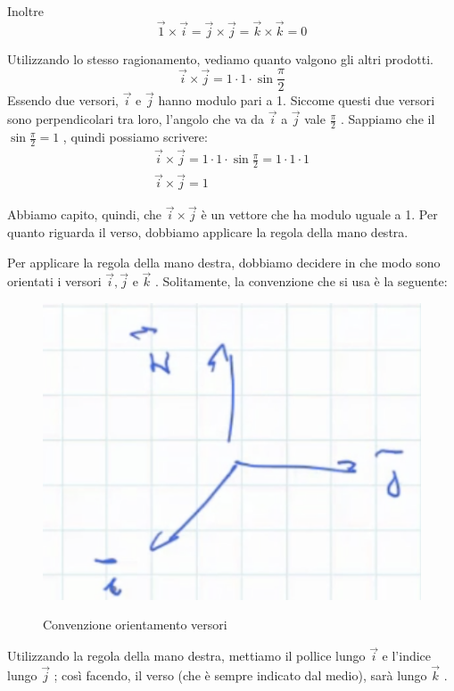 \documentclass[a4paper]{book}
\begin{document}
Inoltre
$$ \overrightarrow{1} \times \overrightarrow{i} = \overrightarrow{j} \times \overrightarrow{j} = \overrightarrow{k} \times \overrightarrow{k} = 0 $$

Utilizzando lo stesso ragionamento, vediamo quanto valgono gli altri prodotti.
$$ \overrightarrow{i} \times \overrightarrow{j} = 1 \cdot 1 \cdot \sin \frac{\pi}{2} $$
Essendo due versori, $ \overrightarrow{i} $ e $ \overrightarrow{j} $ hanno modulo pari a 1. Siccome questi due versori sono perpendicolari tra loro, l'angolo che va da $\overrightarrow{i} $ a $\overrightarrow{j} $ vale $ \frac{\pi}{2} $ .  Sappiamo che il $ \sin \frac{\pi}{2} = 1 $ , quindi possiamo scrivere:
\begin{align*}
\overrightarrow{i} \times \overrightarrow{j} = 1 \cdot 1 \cdot \sin \frac{\pi}{2} = 1 \cdot 1 \cdot 1 \\
\overrightarrow{i} \times \overrightarrow{j} = 1
\end{align*}

Abbiamo capito, quindi, che $ \overrightarrow{i} \times \overrightarrow{j} $ è un vettore che ha modulo uguale a 1. Per quanto riguarda il verso, dobbiamo applicare la regola della mano destra.

Per applicare la regola della mano destra, dobbiamo decidere in che modo sono orientati i versori $ \overrightarrow{i} , \overrightarrow{j} $ e $ \overrightarrow{k} $ . Solitamente, la convenzione che si usa è la seguente:

\begin{figure}[h]
\begin{center}
\includegraphics[width = 0.5 \textwidth]{convenzione versori}
\label{fig:convenzione}
\caption{Convenzione orientamento versori}
\end{center}
\end{figure}

Utilizzando la regola della mano destra, mettiamo il pollice lungo $ \overrightarrow{i} $ e l'indice lungo $ \overrightarrow{j} $ ; così facendo, il verso (che è sempre indicato dal medio), sarà lungo $ \overrightarrow{k} $ .
\end{document}

